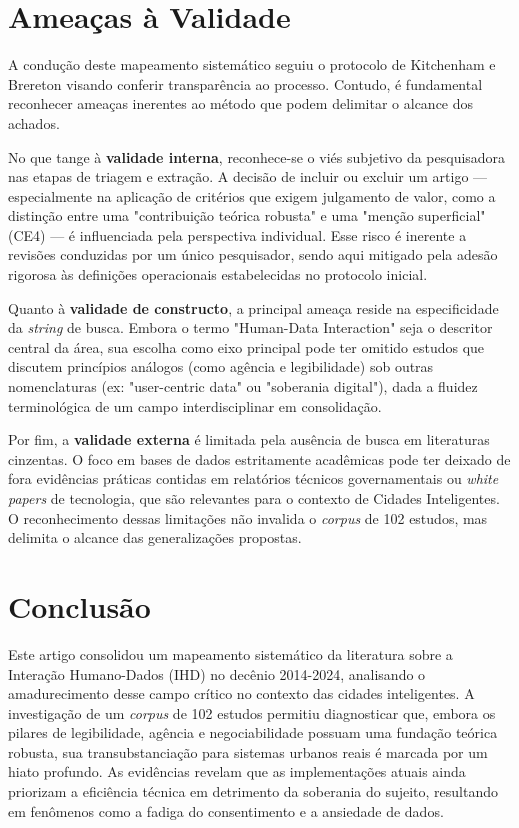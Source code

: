 \documentclass[12pt]{article}
\begin{document}
\section{Ameaças à Validade}

A condução deste mapeamento sistemático seguiu o protocolo de Kitchenham e Brereton \cite{KITCHENHAM2013} visando conferir transparência ao processo. Contudo, é fundamental reconhecer ameaças inerentes ao método que podem delimitar o alcance dos achados.

No que tange à \textbf{validade interna}, reconhece-se o viés subjetivo da pesquisadora nas etapas de triagem e extração. A decisão de incluir ou excluir um artigo — especialmente na aplicação de critérios que exigem julgamento de valor, como a distinção entre uma "contribuição teórica robusta" e uma "menção superficial" (CE4) — é influenciada pela perspectiva individual. Esse risco é inerente a revisões conduzidas por um único pesquisador, sendo aqui mitigado pela adesão rigorosa às definições operacionais estabelecidas no protocolo inicial.

Quanto à \textbf{validade de constructo}, a principal ameaça reside na especificidade da \textit{string} de busca. Embora o termo "Human-Data Interaction" seja o descritor central da área, sua escolha como eixo principal pode ter omitido estudos que discutem princípios análogos (como agência e legibilidade) sob outras nomenclaturas (ex: "user-centric data" ou "soberania digital"), dada a fluidez terminológica de um campo interdisciplinar em consolidação. 

Por fim, a \textbf{validade externa} é limitada pela ausência de busca em literaturas cinzentas. O foco em bases de dados estritamente acadêmicas pode ter deixado de fora evidências práticas contidas em relatórios técnicos governamentais ou \textit{white papers} de tecnologia, que são relevantes para o contexto de Cidades Inteligentes. O reconhecimento dessas limitações não invalida o \textit{corpus} de 102 estudos, mas delimita o alcance das generalizações propostas.


\section{Conclusão}

Este artigo consolidou um mapeamento sistemático da literatura sobre a Interação Humano-Dados (IHD) no decênio 2014-2024, analisando o amadurecimento desse campo crítico no contexto das cidades inteligentes. A investigação de um \textit{corpus} de 102 estudos permitiu diagnosticar que, embora os pilares de legibilidade, agência e negociabilidade possuam uma fundação teórica robusta, sua transubstanciação para sistemas urbanos reais é marcada por um hiato profundo. As evidências revelam que as implementações atuais ainda priorizam a eficiência técnica em detrimento da soberania do sujeito, resultando em fenômenos como a fadiga do consentimento e a ansiedade de dados.
\end{document}
